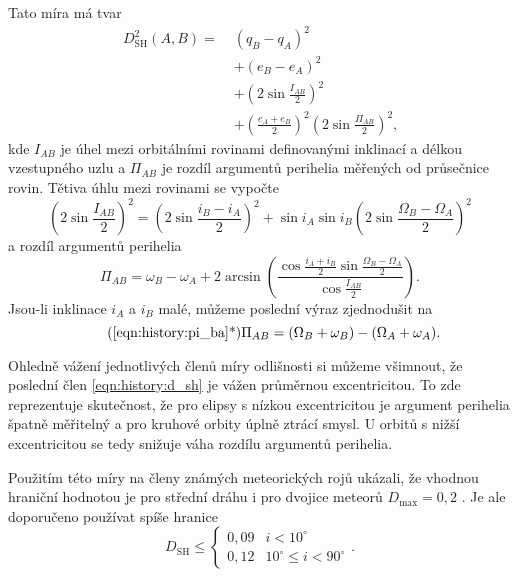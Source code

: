 Tato míra má tvar \cite{dsh}\cite{remarks}
\begin{equation}
    \begin{aligned}
        D_\text{SH}^2(A,B)=\; & (q_B-q_A)^2                                                                         \\
                         & +(e_B-e_A)^2                                                                        \\
                         & +\left( 2\sin{\frac{I_{AB}}{2}} \right)^2                                           \\
                         & +\left( \frac{e_A+e_B}{2} \right)^2\left( 2\sin{\frac{\Pi_{AB}}{2}} \right)^2 \text{,}
    \end{aligned}
    \label{eqn:history:d_sh}
\end{equation}
kde $I_{AB}$ je úhel mezi orbitálními rovinami definovanými inklinací a délkou vzestupného uzlu a $\Pi_{AB}$ je rozdíl argumentů perihelia měřených od průsečnice rovin. Tětiva úhlu mezi rovinami se vypočte \cite{dsh}
\begin{equation}
    \left( 2\sin{\frac{I_{AB}}{2}} \right)^2=\left( 2\sin{\frac{i_B-i_A}{2}} \right)^2
    + \sin{i_A}\sin{i_B}\left( 2\sin{\frac{\Omega_B-\Omega_A}{2}} \right)^2
    \label{eqn:history:i_ba}
\end{equation}
a rozdíl argumentů perihelia \cite{dsh}
\begin{equation}
    \Pi_{AB}=\omega_B-\omega_A+2\arcsin{\left( \frac{\cos{\frac{i_A+i_B}{2}}\sin{\frac{\Omega_B-\Omega_A}{2}}}{\cos{\frac{I_{AB}}{2}}} \right)} \text{.}
    \label{eqn:history:pi_ba}
\end{equation}
Jsou-li inklinace $i_A$ a $i_B$ malé, můžeme poslední výraz zjednodušit na \cite{dsh}
\begin{equation}
    \tag{\ref{eqn:history:pi_ba}*}
    \Pi_{AB}=(\Omega_B+\omega_B)-(\Omega_A+\omega_A) \text{.}
\end{equation}

Ohledně vážení jednotlivých členů míry odlišnosti si můžeme všimnout, že poslední člen \eqref{eqn:history:d_sh} je vážen průměrnou excentricitou. To zde reprezentuje skutečnost, že pro elipsy s nízkou excentricitou je argument perihelia špatně měřitelný \cite{cometassoc} a pro kruhové orbity úplně ztrácí smysl. U orbitů s nižší excentricitou se tedy snižuje váha rozdílu argumentů perihelia.

\smallskip

Použitím této míry na členy známých meteorických rojů \citeauthor{dsh} ukázali, že vhodnou hraniční hodnotou je pro střední dráhu i pro dvojice meteorů $D_\text{max}=0{,}2$ \cite{dsh}. Je ale doporučeno používat spíše hranice \cite{galligan}
$$
D_\text{SH} \le \begin{cases}
    0{,}09 & i < 10^\circ \\
    0{,}12 & 10^\circ \le i < 90^\circ
\end{cases}\text{.}
$$